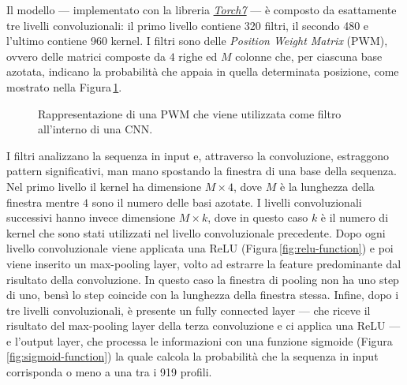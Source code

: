 Il modello — implementato con la libreria \href{https://github.com/torch/torch7}{\textsl{Torch7}} — è composto da esattamente tre livelli convoluzionali: il primo livello contiene 320 filtri, il secondo 480 e l'ultimo contiene 960 kernel. I filtri sono delle \textit{Position Weight Matrix} (\acs{PWM}), ovvero delle matrici composte da $4$ righe ed $M$ colonne che, per ciascuna base azotata, indicano la probabilità che appaia in quella determinata posizione, come mostrato nella Figura\,\ref{fig:PWM}.
% 
\begin{figure}[!b]
    \centering
    
    \caption[Rappresentazione di una \acs{PWM}.]{Rappresentazione di una \acs{PWM} che viene utilizzata come filtro all'interno di una \acs{CNN}.}\label{fig:PWM}
\end{figure}
% 
I filtri analizzano la sequenza in input e, attraverso la convoluzione, estraggono pattern significativi, man mano spostando la finestra di una base della sequenza. Nel primo livello il kernel ha dimensione $M\times 4$, dove $M$ è la lunghezza della finestra mentre $4$ sono il numero delle basi azotate. I livelli convoluzionali successivi hanno invece dimensione $M\times k$, dove in questo caso $k$ è il numero di kernel che sono stati utilizzati nel livello convoluzionale precedente. Dopo ogni livello convoluzionale viene applicata una \acs{ReLU} (Figura\,\ref{fig:relu-function}) e poi viene inserito un max-pooling layer, volto ad estrarre la feature predominante dal risultato della convoluzione. In questo caso la finestra di pooling non ha uno step di uno, bensì lo step coincide con la lunghezza della finestra stessa. Infine, dopo i tre livelli convoluzionali, è presente un fully connected layer — che riceve il risultato del max-pooling layer della terza convoluzione e ci applica una \acs{ReLU} — e l'output layer, che processa le informazioni con una funzione sigmoide (Figura\,\ref{fig:sigmoid-function}) la quale calcola la probabilità che la sequenza in input corrisponda o meno a una tra i 919 profili.

